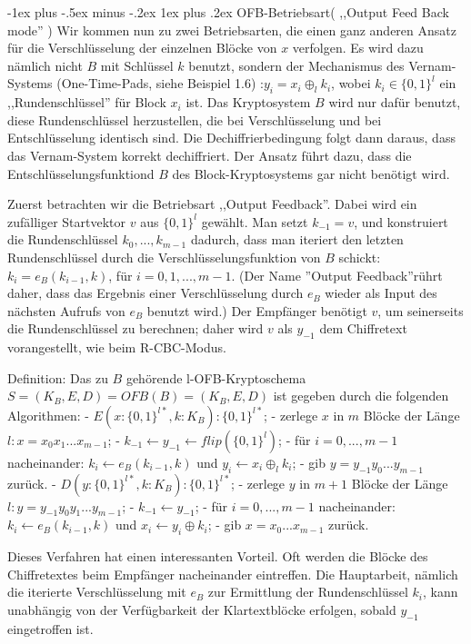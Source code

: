 \documentclass[a4paper]{article}
\makeatletter
\renewcommand{\subsubsection}{\@startsection{subsubsection}{3}{0mm}%
 {-1ex plus -.5ex minus -.2ex}%
 {1ex plus .2ex}%
 {\normalfont\small\bfseries}}
\makeatother
\begin{document}
\begin{multicols}{3}
    \subsubsection{OFB-Betriebsart( ,,Output Feed Back mode'' )}
    Wir kommen nun zu zwei Betriebsarten, die einen ganz anderen Ansatz für die Verschlüsselung der einzelnen Blöcke von $x$ verfolgen. Es wird dazu nämlich nicht $B$ mit Schlüssel $k$ benutzt, sondern der Mechanismus des Vernam-Systems (One-Time-Pads, siehe Beispiel 1.6) :$y_i=x_i\oplus_l k_i$, wobei $k_i\in\{0,1\}^l$ ein ,,Rundenschlüssel'' für Block $x_i$ ist. Das Kryptosystem $B$ wird nur dafür benutzt, diese Rundenschlüssel herzustellen, die bei Verschlüsselung und bei Entschlüsselung identisch sind. Die Dechiffrierbedingung folgt dann daraus, dass das Vernam-System korrekt dechiffriert. Der Ansatz führt dazu, dass die Entschlüsselungsfunktiond $B$ des Block-Kryptosystems gar nicht benötigt wird.

    Zuerst betrachten wir die Betriebsart ,,Output Feedback''. Dabei wird ein zufälliger Startvektor $v$ aus $\{0,1\}^l$ gewählt. Man setzt $k_{-1}=v$, und konstruiert die Rundenschlüssel $k_0,...,k_{m-1}$ dadurch, dass man iteriert den letzten Rundenschlüssel durch die Verschlüsselungsfunktion von $B$ schickt: $k_i=e_B(k_{i-1}, k)$, für $i=0,1,...,m-1$. (Der Name ''Output Feedback''rührt daher, dass das Ergebnis einer Verschlüsselung durch $e_B$ wieder als Input des nächsten Aufrufs von $e_B$ benutzt wird.) Der Empfänger benötigt $v$, um seinerseits die Rundenschlüssel zu berechnen; daher wird $v$ als $y_{-1}$ dem Chiffretext vorangestellt, wie beim R-CBC-Modus.

    Definition: Das zu $B$ gehörende l-OFB-Kryptoschema $S=(K_B,E,D) =OFB(B) =(K_B,E,D)$ ist gegeben durch die folgenden Algorithmen:
    - $E(x:\{0,1\}^{l*},k:K_B) :\{0,1\}^{l*}$;
    - zerlege $x$ in $m$ Blöcke der Länge $l:x=x_0 x_1 ...x_{m-1}$;
    - $k_{-1} \leftarrow y_{-1} \leftarrow flip(\{0,1\}^l)$;
    - für $i=0,...,m-1$ nacheinander: $k_i\leftarrow e_B(k_{i-1},k)$ und $y_i\leftarrow x_i\oplus_l k_i$;
    - gib $y=y_{-1} y_0 ...y_{m-1}$ zurück.
    - $D(y:\{0,1\}^{l*},k:K_B) :\{0,1\}^{l*}$;
    - zerlege $y$ in $m+1$ Blöcke der Länge $l:y=y_{-1} y_0 y_1 ...y_{m-1}$;
    - $k_{-1} \leftarrow y_{-1}$;
    - für $i=0,...,m-1$ nacheinander: $k_i\leftarrow e_B(k_{i-1} ,k)$ und $x_i\leftarrow y_i\oplus k_i$;
    - gib $x=x_0 ...x_{m-1}$ zurück.

    Dieses Verfahren hat einen interessanten Vorteil. Oft werden die Blöcke des Chiffretextes beim Empfänger nacheinander eintreffen. Die Hauptarbeit, nämlich die iterierte Verschlüsselung mit $e_B$ zur Ermittlung der Rundenschlüssel $k_i$, kann unabhängig von der Verfügbarkeit der Klartextblöcke erfolgen, sobald $y_{-1}$ eingetroffen ist.


\end{multicols}
\end{document}
